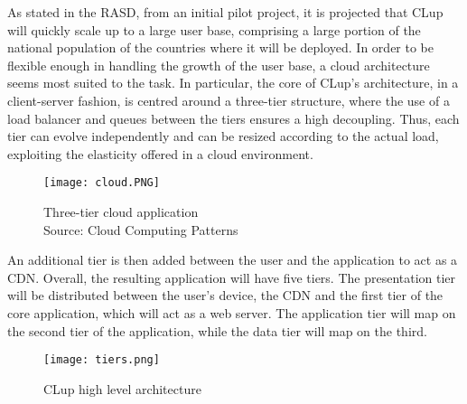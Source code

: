 \documentclass[../../main.tex]{subfiles}
\begin{document}
As stated in the RASD, from an initial pilot project, it is projected that CLup will quickly scale up to a large user base, 
comprising a large portion of the national population of the countries where it will be deployed. 
In order to be flexible enough in handling the growth of the user base, a cloud architecture seems most suited to the task. 
In particular, the core of CLup's architecture, in a client-server fashion, is centred around a three-tier structure, where the use of a load balancer 
and queues between the tiers ensures a high decoupling. 
Thus, each tier can evolve independently and can be resized according to the actual load, 
exploiting the elasticity offered in a cloud environment.

\begin{figure}[H]
    \centering
    \texttt{[image: cloud.PNG]}
    \caption{
        Three-tier cloud application\\
        Source: Cloud Computing Patterns
    }
\end{figure}

An additional tier is then added between the user and the application to act as a CDN. Overall,
 the resulting application will have five tiers.
The presentation tier will be distributed between the user's device, the CDN and the first tier of the core application, which will act as a web server. The application tier will map on the second tier of the application, while the data tier will map on the third.


\begin{figure}[H]
    \centering
    \texttt{[image: tiers.png]}
    \caption{
        CLup high level architecture
    }
\end{figure}
\end{document}
